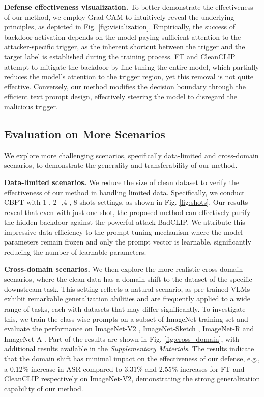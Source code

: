 \textbf{Defense effectiveness visualization.}
To better demonstrate the effectiveness of our method, we employ Grad-CAM \cite{selvaraju2017grad} to intuitively reveal the underlying principles, as depicted in Fig. \ref{fig:visialization}. Empirically, the success of backdoor activation depends on the model paying sufficient attention to the attacker-specific trigger, as the inherent shortcut between the trigger and the target label is established during the training process. FT and CleanCLIP attempt to mitigate the backdoor by fine-tuning the entire model, which partially reduces the model's attention to the trigger region, yet this removal is not quite effective. Conversely, our method modifies the decision boundary through the efficient text prompt design, effectively steering the model to disregard the malicious trigger.

\subsection{Evaluation on More Scenarios}
We explore more challenging scenarios, specifically data-limited and cross-domain scenarios, to demonstrate the generality and transferability of our method.

\textbf{Data-limited scenarios.}
We reduce the size of clean dataset to verify the effectiveness of our method in handling limited data. Specifically, we conduct CBPT with 1-, 2- ,4-, 8-shots settings, as shown in Fig. \ref{fig:shots}. Our results reveal that even with just one shot, the proposed method can effectively purify the hidden backdoor against the powerful attack BadCLIP. We attribute this impressive data efficiency to the prompt tuning mechanism where the model parameters remain frozen and only the prompt vector is learnable, significantly reducing the number of learnable parameters.

\textbf{Cross-domain scenarios.}
We then explore the more realistic cross-domain scenarios, where the clean data has a domain shift to the dataset of the specific downstream task. This setting reflects a natural scenario, as pre-trained VLMs exhibit remarkable generalization abilities and are frequently applied to a wide range of tasks, each with datasets that may differ significantly. To investigate this, we train the class-wise prompts on a subset of ImageNet training set and evaluate the performance on ImageNet-V2 \cite{recht2019imagenet}, ImageNet-Sketch \cite{wang2019learning}, ImageNet-R \cite{hendrycks2021many} and ImageNet-A \cite{hendrycks2021natural}. Part of the results are shown in Fig. \ref{fig:cross_domain}, with additional results available in the \textit{Supplementary Materials}. The results indicate that the domain shift has minimal impact on the effectiveness of our defense, e.g., a 0.12\% increase in ASR compared to 3.31\% and 2.55\% increases for FT and CleanCLIP respectively on ImageNet-V2, demonstrating the strong generalization capability of our method. 

